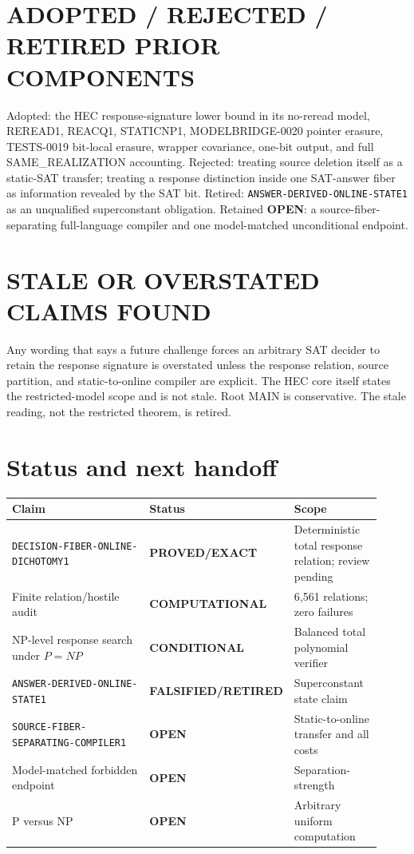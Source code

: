 \documentclass[11pt]{article}
\newcommand{\EXACT}{\textbf{PROVED/EXACT}}
\newcommand{\COMP}{\textbf{COMPUTATIONAL}}
\newcommand{\COND}{\textbf{CONDITIONAL}}
\newcommand{\OPEN}{\textbf{OPEN}}
\newcommand{\RETIRED}{\textbf{FALSIFIED/RETIRED}}
\begin{document}
\section{ADOPTED / REJECTED / RETIRED PRIOR COMPONENTS}

Adopted: the HEC response-signature lower bound in its no-reread model,
REREAD1, REACQ1, STATICNP1, MODELBRIDGE-0020 pointer erasure, TESTS-0019
bit-local erasure, wrapper covariance, one-bit output, and full
SAME\_REALIZATION accounting.  Rejected: treating source deletion itself as
a static-SAT transfer; treating a response distinction inside one SAT-answer
fiber as information revealed by the SAT bit.  Retired:
\texttt{ANSWER-DERIVED-ONLINE-STATE1} as an unqualified superconstant
obligation.  Retained \OPEN: a source-fiber-separating full-language compiler
and one model-matched unconditional endpoint.

\section{STALE OR OVERSTATED CLAIMS FOUND}

Any wording that says a future challenge forces an arbitrary SAT decider to
retain the response signature is overstated unless the response relation,
source partition, and static-to-online compiler are explicit.  The HEC core
itself states the restricted-model scope and is not stale.  Root MAIN is
conservative.  The stale reading, not the restricted theorem, is retired.

\section{Status and next handoff}

\begin{center}\small
\begin{tabular}{p{0.47\linewidth}p{0.20\linewidth}p{0.25\linewidth}}
\toprule
Claim & Status & Scope\\ \midrule
\texttt{DECISION-FIBER-ONLINE-DICHOTOMY1} & \EXACT & Deterministic total response relation; review pending\\
Finite relation/hostile audit & \COMP & 6,561 relations; zero failures\\
NP-level response search under $P=NP$ & \COND & Balanced total polynomial verifier\\
\texttt{ANSWER-DERIVED-ONLINE-STATE1} & \RETIRED & Superconstant state claim\\
\texttt{SOURCE-FIBER-SEPARATING-COMPILER1} & \OPEN & Static-to-online transfer and all costs\\
Model-matched forbidden endpoint & \OPEN & Separation-strength\\
P versus NP & \OPEN & Arbitrary uniform computation\\
\bottomrule
\end{tabular}
\end{center}
\end{document}
